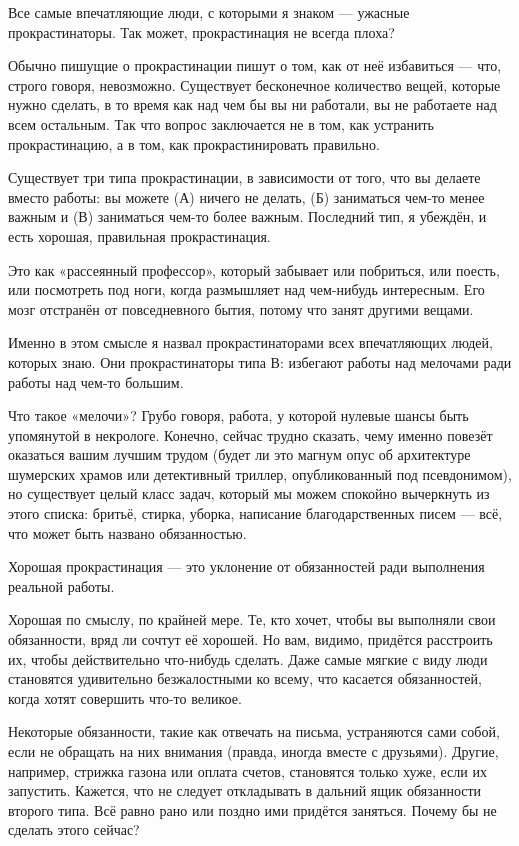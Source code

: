 \documentclass[ebook,12pt,oneside,openany]{memoir}
\begin{document}
\maketitle

Все самые впечатляющие люди, с которыми я знаком — ужасные
прокрастинаторы. Так может, прокрастинация не всегда плоха?

Обычно пишущие о прокрастинации пишут о том, как от неё избавиться —
что, строго говоря, невозможно. Существует бесконечное количество
вещей, которые нужно сделать, в то время как над чем бы вы ни
работали, вы не работаете над всем остальным. Так что вопрос
заключается не в том, как устранить прокрастинацию, а в том, как
прокрастинировать правильно.

Существует три типа прокрастинации, в зависимости от того, что вы
делаете вместо работы: вы можете (А) ничего не делать, (Б) заниматься
чем-то менее важным и (В) заниматься чем-то более важным. Последний
тип, я убеждён, и есть хорошая, правильная прокрастинация.

Это как «рассеянный профессор», который забывает или побриться, или
поесть, или посмотреть под ноги, когда размышляет над чем-нибудь
интересным. Его мозг отстранён от повседневного бытия, потому что
занят другими вещами.

Именно в этом смысле я назвал прокрастинаторами всех впечатляющих
людей, которых знаю. Они прокрастинаторы типа В: избегают работы над
мелочами ради работы над чем-то большим.

Что такое «мелочи»? Грубо говоря, работа, у которой нулевые шансы быть
упомянутой в некрологе. Конечно, сейчас трудно сказать, чему именно
повезёт оказаться вашим лучшим трудом (будет ли это магнум опус об
архитектуре шумерских храмов или детективный триллер, опубликованный
под псевдонимом), но существует целый класс задач, который мы можем
спокойно вычеркнуть из этого списка: бритьё, стирка, уборка, написание
благодарственных писем — всё, что может быть названо обязанностью.

Хорошая прокрастинация — это уклонение от обязанностей ради выполнения
реальной работы.

Хорошая по смыслу, по крайней мере. Те, кто хочет, чтобы вы выполняли
свои обязанности, вряд ли сочтут её хорошей. Но вам, видимо, придётся
расстроить их, чтобы действительно что-нибудь сделать. Даже самые
мягкие с виду люди становятся удивительно безжалостными ко всему, что
касается обязанностей, когда хотят совершить что-то великое.

Некоторые обязанности, такие как отвечать на письма, устраняются сами
собой, если не обращать на них внимания (правда, иногда вместе с
друзьями). Другие, например, стрижка газона или оплата счетов,
становятся только хуже, если их запустить. Кажется, что не следует
откладывать в дальний ящик обязанности второго типа. Всё равно рано
или поздно ими придётся заняться. Почему бы не сделать этого сейчас?
\end{document}
